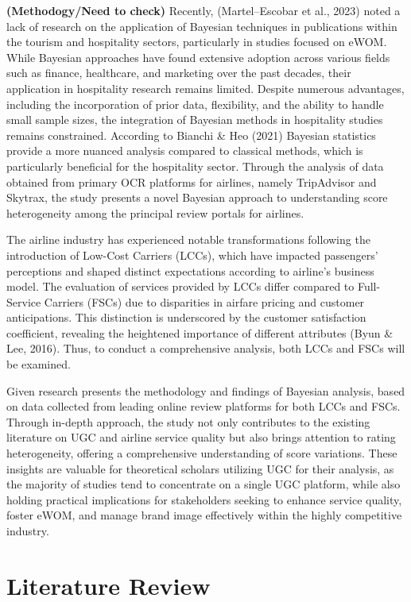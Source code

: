 \documentclass[
]{agujournal2019}
\begin{document}
\textbf{(Methodogy/Need to check)} Recently, (Martel--Escobar et al.,
2023) noted a lack of research on the application of Bayesian techniques
in publications within the tourism and hospitality sectors, particularly
in studies focused on eWOM. While Bayesian approaches have found
extensive adoption across various fields such as finance, healthcare,
and marketing over the past decades, their application in hospitality
research remains limited. Despite numerous advantages, including the
incorporation of prior data, flexibility, and the ability to handle
small sample sizes, the integration of Bayesian methods in hospitality
studies remains constrained. According to Bianchi \& Heo (2021) Bayesian
statistics provide a more nuanced analysis compared to classical
methods, which is particularly beneficial for the hospitality sector.
Through the analysis of data obtained from primary OCR platforms for
airlines, namely TripAdvisor and Skytrax, the study presents a novel
Bayesian approach to understanding score heterogeneity among the
principal review portals for airlines.

The airline industry has experienced notable transformations following
the introduction of Low-Cost Carriers (LCCs), which have impacted
passengers' perceptions and shaped distinct expectations according to
airline's business model. The evaluation of services provided by LCCs
differ compared to Full-Service Carriers (FSCs) due to disparities in
airfare pricing and customer anticipations. This distinction is
underscored by the customer satisfaction coefficient, revealing the
heightened importance of different attributes (Byun \& Lee, 2016). Thus,
to conduct a comprehensive analysis, both LCCs and FSCs will be
examined.

Given research presents the methodology and findings of Bayesian
analysis, based on data collected from leading online review platforms
for both LCCs and FSCs. Through in-depth approach, the study not only
contributes to the existing literature on UGC and airline service
quality but also brings attention to rating heterogeneity, offering a
comprehensive understanding of score variations. These insights are
valuable for theoretical scholars utilizing UGC for their analysis, as
the majority of studies tend to concentrate on a single UGC platform,
while also holding practical implications for stakeholders seeking to
enhance service quality, foster eWOM, and manage brand image effectively
within the highly competitive industry.

\section{Literature Review}\label{sec-lit-review}
\end{document}
